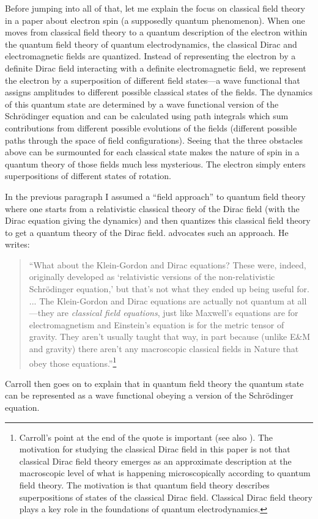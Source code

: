 \documentclass[onecolumn,secnumarabic,amsmath,amssymb,balancelastpage,nofootinbib]{article}
\begin{document}
Before jumping into all of that, let me explain the focus on classical field theory in a paper about electron spin (a supposedly quantum phenomenon).  When one moves from classical field theory to a quantum description of the electron within the quantum field theory of quantum electrodynamics, the classical Dirac and electromagnetic fields are quantized.  Instead of representing the electron by a definite Dirac field interacting with a definite electromagnetic field, we represent the electron by a superposition of different field states---a wave functional that assigns amplitudes to different possible classical states of the fields.  The dynamics of this quantum state are determined by a wave functional version of the Schr\"{o}dinger equation and can be calculated using path integrals which sum contributions from different possible evolutions of the fields (different possible paths through the space of field configurations).  Seeing that the three obstacles above can be surmounted for each classical state makes the nature of spin in a quantum theory of those fields much less mysterious.  The electron simply enters superpositions of different states of rotation.

In the previous paragraph I assumed a ``field approach'' to quantum field theory where one starts from a relativistic classical theory of the Dirac field (with the Dirac equation giving the dynamics) and then quantizes this classical field theory to get a quantum theory of the Dirac field.  \citet{carrollblog} advocates such an approach.  He writes:
\begin{quote}
``What about the Klein-Gordon and Dirac equations? These were, indeed, originally developed as `relativistic versions of the non-relativistic Schr\"{o}dinger equation,' but that's not what they ended up being useful for. ... The Klein-Gordon and Dirac equations are actually not quantum at all---they are \emph{classical field equations}, just like Maxwell's equations are for electromagnetism and Einstein's equation is for the metric tensor of gravity. They aren't usually taught that way, in part because (unlike E\&M and gravity) there aren't any macroscopic classical fields in Nature that obey those equations.''\footnote{Carroll's point at the end of the quote is important (see also \citealp[chapter 8]{duncan}).  The motivation for studying the classical Dirac field in this paper is not that classical Dirac field theory emerges as an approximate description at the macroscopic level of what is happening microscopically according to quantum field theory.  The motivation is that quantum field theory describes superpositions of states of the classical Dirac field.  Classical Dirac field theory plays a key role in the foundations of quantum electrodynamics.}
\end{quote}
Carroll then goes on to explain that in quantum field theory the quantum state can be represented as a wave functional obeying a version of the Schr\"{o}dinger equation.
\end{document}
